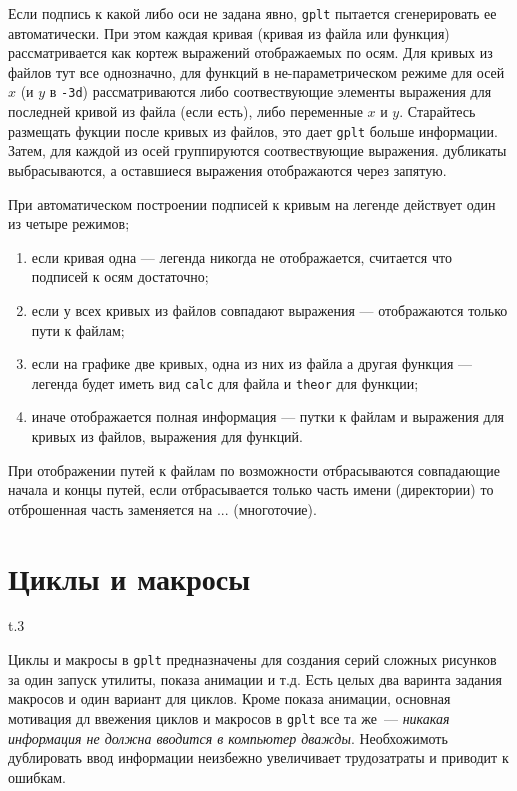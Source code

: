 \documentclass[12pt]{article}
\def\gplt{{\tt gplt}}
\begin{document}
Если подпись к какой либо оси не задана явно, \gplt{} пытается сгенерировать ее автоматически.
При этом каждая кривая (кривая из файла или функция) рассматривается как кортеж выражений отображаемых по осям.
Для кривых из файлов тут все однозначно, для функций в не-параметрическом режиме для осей $x$ (и $y$ в \verb'-3d')
рассматриваются либо соотвествующие элементы выражения для последней кривой из файла (если есть), либо 
переменные $x$ и $y$. Старайтесь размещать фукции после кривых из файлов, это дает \gplt{} больше информации.
Затем, для каждой из осей группируются соотвествующие выражения. дубликаты выбрасываются, а оставшиеся выражения отображаются через запятую.

При автоматическом построении подписей к кривым на легенде действует один из четыре режимов;
\begin{enumerate}
\item если кривая одна --- легенда никогда не отображается, считается что подписей к осям достаточно;
\item если у всех кривых из файлов совпадают выражения --- отображаются только пути к файлам;
\item если на графике две кривых, одна из них из файла а другая функция --- легенда будет иметь вид \verb'calc' для файла и \verb'theor' для функции;
\item иначе отображается полная информация --- путки к файлам и выражения для кривых из файлов, выражения для функций.
\end{enumerate}
При отображении путей к файлам по возможности отбрасываются совпадающие начала и концы путей, если отбрасывается только часть имени (директории)
то отброшенная часть заменяется на ...
(многоточие).

\section{Циклы и макросы}\label{macroloops}
\begin{wrapfigure}[7]{t}{.3\textwidth}
  \vphantom{.}
  \vspace{-2.7cm}

\end{wrapfigure}
Циклы и макросы в \gplt{} предназначены для создания серий сложных рисунков за один запуск утилиты, показа анимации и т.д.
Есть целых два варинта задания макросов и один вариант для циклов.
Кроме показа анимации, основная мотивация дл ввежения циклов и макросов в \gplt{} все та же~--- {\it никакая информация не должна вводится в компьютер дважды}.
Необхожимоть дублировать ввод информации неизбежно увеличивает трудозатраты и приводит к ошибкам.
\end{document}
